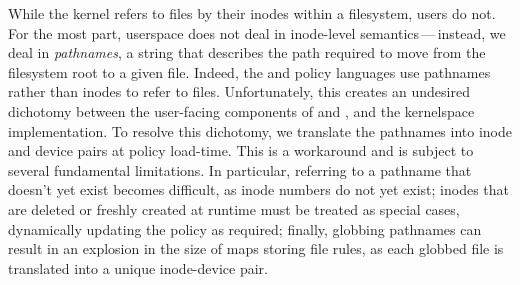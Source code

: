 While the kernel refers to files by their inodes within a filesystem, users do not. For
the most part, userspace does not deal in inode-level semantics\,---\,instead, we deal in
\textit{pathnames}, a string that describes the path required to move from the filesystem
root to a given file. Indeed, the \bpfbox{} and \bpfcontain{} policy languages use
pathnames rather than inodes to refer to files. Unfortunately, this creates an undesired
dichotomy between the user-facing components of \bpfbox{} and \bpfcontain{}, and the
kernelspace implementation.  To resolve this dichotomy, we translate the pathnames into
inode and device pairs at policy load-time. This is a workaround and is subject to several
fundamental limitations. In particular, referring to a pathname that doesn't yet exist
becomes difficult, as inode numbers do not yet exist; inodes that are deleted or freshly
created at runtime must be treated as special cases, dynamically updating the policy as
required; finally, globbing pathnames can result in an explosion in the size of maps
storing file rules, as each globbed file is translated into a unique inode-device pair.

